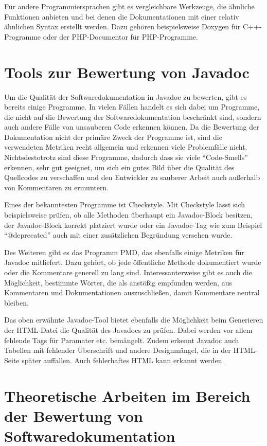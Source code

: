 Für andere Programmiersprachen gibt es vergleichbare Werkzeuge, die ähnliche Funktionen anbieten und bei denen die Dokumentationen mit einer relativ ähnlichen Syntax erstellt werden. Dazu gehören beispielsweise Doxygen für C++-Programme oder der PHP-Documentor für PHP-Programme. 
\section{Tools zur Bewertung von Javadoc}
Um die Qualität der Softwaredokumentation in Javadoc zu bewerten, gibt es bereits einige Programme. In vielen Fällen handelt es sich dabei um Programme, die nicht auf die Bewertung der Softwaredokumentation beschränkt sind, sondern auch andere Fälle von unsauberen Code erkennen können. Da die Bewertung der Dokumentation nicht der primäre Zweck der Programme ist, sind die verwendeten Metriken recht allgemein und erkennen viele Problemfälle nicht. Nichtsdestotrotz sind diese Programme, dadurch dass sie viele \enquote{Code-Smells} erkennen, sehr gut geeignet, um sich ein gutes Bild über die Qualität des Quellcodes zu verschaffen und den Entwickler zu sauberer Arbeit auch außerhalb von Kommentaren zu ermuntern. 

Eines der bekanntesten Programme ist Checkstyle. Mit Checkstyle lässt sich beispielsweise prüfen, ob alle Methoden überhaupt ein Javadoc-Block besitzen, der Javadoc-Block korrekt platziert wurde oder ein Javadoc-Tag wie zum Beispiel \enquote{@deprecated} auch mit einer zusätzlichen Begründung versehen wurde. 

Des Weiteren gibt es das Programm PMD, das ebenfalls einige Metriken für Javadoc mitliefert. Dazu gehört, ob jede öffentliche Methode dokumentiert wurde oder die Kommentare generell zu lang sind. Interessanterweise gibt es auch die Möglichkeit, bestimmte Wörter, die als anstößig empfunden werden, aus Kommentaren und Dokumentationen auszuschließen, damit Kommentare neutral bleiben. 

Das oben erwähnte Javadoc-Tool bietet ebenfalls die Möglichkeit beim Generieren der HTML-Datei die Qualität des Javadocs zu prüfen. Dabei werden vor allem fehlende Tags für Paramater etc. bemängelt. Zudem erkennt Javadoc auch Tabellen mit fehlender Überschrift und andere Designmängel, die in der HTML-Seite später auffallen. Auch fehlerhaftes HTML kann erkannt werden. 

\section{Theoretische Arbeiten im Bereich der Bewertung von Softwaredokumentation}

